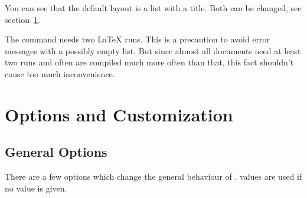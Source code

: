 \documentclass[DIV10,toc=index,toc=bib,hyperfootnotes=false]{cnpkgdoc}
\begin{document}
You can see that the default layout is a  list with a
 title. Both can be changed, see section~\ref{sec:customization}.

The command  needs two \LaTeX{} runs. This is a precaution to
avoid error messages with a possibly empty list. But since almost all documents
need at least two runs and often are compiled much more often than that, this
fact shouldn't cause too much inconvenience.

\section{Options and Customization}\label{sec:customization}
\subsection{General Options}
There are a few options which change the general behaviour of \acro.
 values are used if no value is given.
\end{document}
